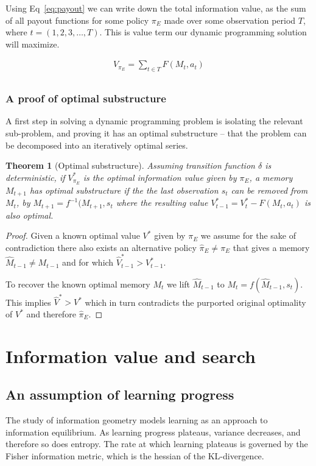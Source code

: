 \documentclass[9pt,twocolumn,twoside]{pnas-new}
\newtheorem{theorem}{Theorem}
\begin{document}
Using Eq~\ref{eq:payout} we can write down the total information value, as the sum of all payout functions for some policy $\pi_E$ made over some observation period $T$, where $t = (1,2,3,\ldots,T)$. This is value term our dynamic programming solution will maximize.

\begin{equation} \label{eq:V}
    \begin{split}
        V_{\pi_E} = \sum_{t \in T} F(M_{t}, a_t)\\
    \end{split}
\end{equation}

\subsubsection*{A proof of optimal substructure}
A first step in solving a dynamic programming problem is isolating the relevant sub-problem, and proving it has an optimal substructure -- that the problem can be decomposed into an iteratively optimal series. 

\begin{theorem}[Optimal substructure] \label{theorem:opt_sub}
    Assuming transition function $\delta$ is deterministic, if $V^*_{\pi_E}$ is the optimal information value given by $\pi_E$, a memory $M_{t+1}$ has optimal substructure if the the last observation $s_t$ can be removed from $M_t$, by $M_{t+1} = f^{-1}(M_{t+1}, s_t$ where the resulting value $V^*_{t-1} = V^*_{t} - F(M_t, a_t)$ is also optimal. 
\end{theorem}
\begin{proof}
    Given a known optimal value $V^*$ given by $\pi_E$ we assume for the sake of contradiction there also exists an alternative policy $\hat \pi_E \neq \pi_E$ that gives a memory $\hat M_{t-1} \neq M_{t-1}$ and for which $\hat V^*_{t-1} > V^*_{t-1}$. 

    To recover the known optimal memory $M_t$ we lift $\hat M_{t-1}$ to $M_t = f(\hat M_{t-1}, s_t)$. This implies $\hat V^* > V^*$ which in turn contradicts the purported original optimality of $V^*$ and therefore $\hat \pi_E$.
\end{proof}


\section*{Information value and search}
\subsection*{An assumption of learning progress}
The study of information geometry models learning as an approach to information equilibrium. As learning progress plateaus, variance decreases, and therefore so does entropy. The rate at which learning plateaus is governed by the Fisher information metric, which is the hessian of the KL-divergence.
\end{document}
